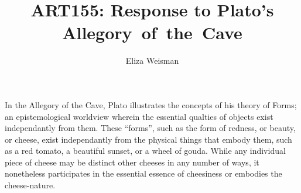 \documentclass[a4paper,12pt]{article}
\title{ART155: Response to Plato's Allegory~of~the~Cave}
\author{Eliza Weisman}
\begin{document}
\maketitle
\doublespacing

In the Allegory of the Cave, Plato illustrates the concepts of his theory of Forms; an epistemological worldview wherein the essential qualties of objects exist independantly from them. These ``forms'', such as the form of redness, or beauty, or cheese, exist independantly from the physical things that embody them, such as a red tomato, a beautiful sunset, or a wheel of gouda. While any individual piece of cheese may be distinct other cheeses in any number of ways, it nonetheless participates in the essential essence of cheesiness or embodies the cheese-nature.

%
\end{document}

